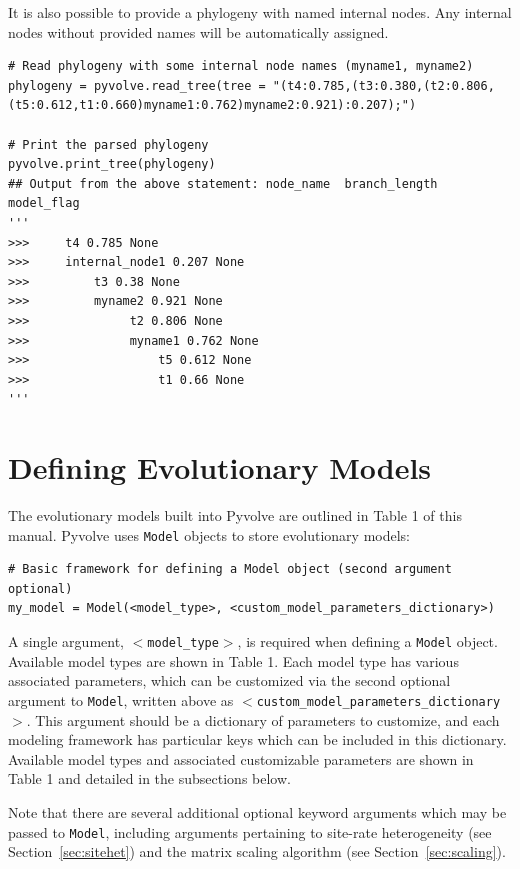 \documentclass{article}
\newcommand{\code}[1]{\texttt{\small{#1}}}
\begin{document}
It is also possible to provide a phylogeny with named internal nodes. Any internal nodes without provided names will be automatically assigned.
\begin{lstlisting}
# Read phylogeny with some internal node names (myname1, myname2)
phylogeny = pyvolve.read_tree(tree = "(t4:0.785,(t3:0.380,(t2:0.806,(t5:0.612,t1:0.660)myname1:0.762)myname2:0.921):0.207);")

# Print the parsed phylogeny
pyvolve.print_tree(phylogeny)
## Output from the above statement: node_name  branch_length  model_flag
'''
>>>     t4 0.785 None
>>>     internal_node1 0.207 None
>>>         t3 0.38 None
>>>         myname2 0.921 None
>>>              t2 0.806 None
>>>              myname1 0.762 None
>>>                  t5 0.612 None
>>>                  t1 0.66 None 
'''
\end{lstlisting}

\section{Defining Evolutionary Models}\label{sec:evomodels}

The evolutionary models built into Pyvolve are outlined in Table 1 of this manual. Pyvolve uses \code{Model} objects to store evolutionary models:
\begin{lstlisting}
# Basic framework for defining a Model object (second argument optional)
my_model = Model(<model_type>, <custom_model_parameters_dictionary>)
\end{lstlisting}
A single argument, \code{$<$model\_type$>$}, is required when defining a \code{Model} object. Available model types are shown in Table 1. Each model type has various associated parameters, which can be customized via the second optional argument to \code{Model}, written above as \code{$<$custom\_model\_parameters\_dictionary$>$}. This argument should be a dictionary of parameters to customize, and each modeling framework has particular keys which can be included in this dictionary. Available model types and associated customizable parameters are shown in Table 1 and detailed in the subsections below. 

Note that there are several additional optional keyword arguments which may be passed to \code{Model}, including arguments pertaining to site-rate heterogeneity (see Section~\ref{sec:sitehet}) and the matrix scaling algorithm (see Section~\ref{sec:scaling}).
\end{document}
